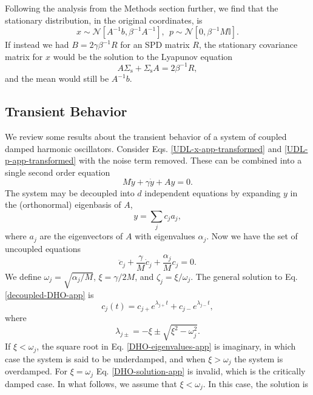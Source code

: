 \documentclass[prx,onecolumn,floatfix,longbibliography,notitlepage, nofootinbib,12pt]{revtex4-2}
\begin{document}
\begin{appendix}
\begin{equation}
\end{equation}
Following the analysis from the Methods section further, we find that the stationary distribution, in the original coordinates, is
\begin{equation}
    x \sim \mathcal{N}[A^{-1}b, \beta^{-1}A^{-1}], \: \: p \sim  \mathcal{N}\left[0, \beta^{-1}M \mathbb{I}\right].
\end{equation}
If instead we had $B = 2\gamma\beta^{-1}R$ for an SPD matrix $R$, the stationary covariance matrix for $x$ would be the solution to the Lyapunov equation
\begin{equation}
    A \Sigma_\text{s} +\Sigma_\text{s} A =2\beta^{-1}R,
\end{equation}
and the mean would still be $A^{-1}b$.

\subsection{Transient Behavior}
We review some results about the transient behavior of a system of coupled damped harmonic oscillators. Consider Eqs. \eqref{UDL-x-app-transformed} and \eqref{UDL-p-app-transformed} with the noise term removed. These can be combined into a single second order equation
\begin{equation}
 M   \ddot{y} + \gamma \dot{y} + A y =0.
\end{equation}
The system may be decoupled into $d$ independent equations by expanding $y$ in the (orthonormal) eigenbasis of $A$,
\begin{equation}
y = \sum_j c_j a_j,
\end{equation}
where $a_j$ are the eigenvectors of $A$ with eigenvalues $\alpha_j$. Now we have the set of uncoupled equations
\begin{equation}
\label{decoupled-DHO-app}
  \ddot{c}_j + \frac{\gamma}{M} \dot{c}_j+ \frac{\alpha_j}{M} c_j =0.
\end{equation}
We define $\omega_j = \sqrt{\alpha_j/M}$, $\xi = \gamma/2M$, and $\zeta_j = \xi/\omega_j $. The general solution to Eq. \eqref{decoupled-DHO-app} is
\begin{equation}
\label{DHO-solution-app}
    c_j(t) = c_{j+} e^{\lambda_{j+} t} + c_{j-}e^{\lambda_{j-}t},
\end{equation}
where 
\begin{equation}
\label{DHO-eigenvalues-app}
    \lambda_{j\pm}=  - \xi \pm \sqrt{\xi^2 - \omega_j^2}.
\end{equation}
If $\xi < \omega_j$, the square root in Eq. \eqref{DHO-eigenvalues-app} is imaginary, in which case the system is said to be underdamped, and when $\xi > \omega_j$ the system is overdamped. For $\xi = \omega_j$ Eq. \eqref{DHO-solution-app} is invalid, which is the critically damped case. In what follows, we assume that $\xi < \omega_j$. In this case, the solution is

\end{appendix}
\end{document}
